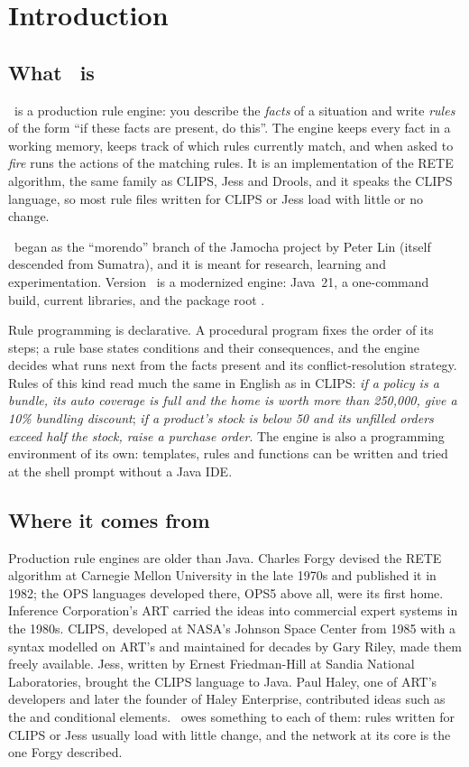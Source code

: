 \chapter{Introduction}
\label{ch:introduction}

\section{What \Morendo\ is}

\Morendo\ is a production rule engine: you describe the \emph{facts} of a
situation and write \emph{rules} of the form ``if these facts are present,
do this''. The engine keeps every fact in a working memory, keeps track of
which rules currently match, and when asked to \emph{fire} runs the actions
of the matching rules. It is an implementation of the RETE algorithm, the
same family as CLIPS, Jess and Drools, and it speaks the CLIPS language, so
most rule files written for CLIPS or Jess load with little or no change.

\Morendo\ began as the ``morendo'' branch of the Jamocha project by Peter
Lin (itself descended from Sumatra), and it is meant for research, learning
and experimentation. Version \version\ is a modernized engine: Java~21, a
one-command build, current libraries, and the package root
.

Rule programming is declarative. A procedural program fixes the order of
its steps; a rule base states conditions and their consequences, and the
engine decides what runs next from the facts present and its
conflict-resolution strategy. Rules of this kind read much the same in
English as in CLIPS: \emph{if a policy is a bundle, its auto coverage is
full and the home is worth more than 250,000, give a 10\% bundling
discount}; \emph{if a product's stock is below 50 and its unfilled orders
exceed half the stock, raise a purchase order}. The engine is also a
programming environment of its own: templates, rules and functions can
be written and tried at the shell prompt without a Java IDE.

\section{Where it comes from}

Production rule engines are older than Java. Charles Forgy devised the
RETE algorithm at Carnegie Mellon University in the late 1970s and
published it in 1982; the OPS languages developed there, OPS5 above all,
were its first home. Inference Corporation's ART carried the ideas into
commercial expert systems in the 1980s. CLIPS, developed at NASA's
Johnson Space Center from 1985 with a syntax modelled on ART's and
maintained for decades by Gary Riley, made them freely available. Jess,
written by Ernest Friedman-Hill at Sandia National Laboratories, brought
the CLIPS language to Java. Paul Haley, one of ART's developers and
later the founder of Haley Enterprise, contributed ideas such as the
 and  conditional elements. \Morendo\ owes
something to each of them: rules written for CLIPS or Jess usually load
with little change, and the network at its core is the one Forgy
described.

